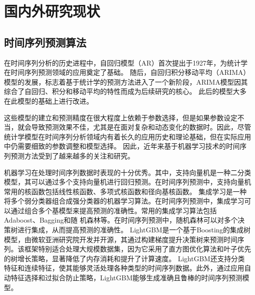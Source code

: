 \section{国内外研究现状}
\subsection{时间序列预测算法}
在时间序列分析的历史进程中，自回归模型\cite{PhysRevE.84.016106}（AR）首次提出于1927年，为统计学在时间序列预测领域的应用奠定了基础。
随后，自回归积分移动平均\cite{jiang2011multifractal}（ARIMA）模型的发展，标志着基于统计学的预测方法进入了一个新阶段，ARIMA模型因其综合了自回归、积分和移动平均的特性而成为后续研究的核心。
此后的模型大多在此模型的基础上进行改进。

这些模型的建立和预测精度在很大程度上依赖于参数选择，但是如果参数设定不当，就会导致预测效果不佳，尤其是在面对复杂和动态变化的数据时。因此，尽管统计学模型在时间序列分析领域内有着长久的应用历史和理论基础，但在实际应用中仍需要细致的参数调整和模型选择。
因此，近年来基于机器学习技术的时间序列预测方法受到了越来越多的关注和研究。

机器学习在处理时间序列数据时表现的十分优秀。其中，支持向量机\cite{zhang2020support}是一种二分类模型，其可以通过多个支持向量机进行回归预测\cite{sapankevych2009time}。在时间序列预测中，支持向量机常用的核函数包括线性核函数、多项式核函数和径向基核函数。
集成学习\cite{dong2020survey}是一种将多个弱分类器组合成强分类器的机器学习算法。在时间序列预测中，集成学习可以通过组合多个基模型来提高预测的准确性\cite{galicia2019multi}。常用的集成学习算法包括Adaboost\cite{hastie2009multi}、Bagging\cite{quinlan1996bagging}和随
机森林\cite{genuer2020random}等。在时间序列预测中，随机森林可以对多个决策树进行集成，从而提高预测的准确性\cite{khashei2019comparative}。
LightGBM\cite{ke2017lightgbm}是一个基于Boosting的集成树模型，由微软亚洲研究院开发并开源，其通过构建梯度提升决策树来预测时间序列。该框架特别适合处理大规模数据集，因为它采用了直方图优化算法和叶子优先的树增长策略，显著降低了内存消耗和提升了计算速度。
LightGBM还支持分类特征和连续特征，使其能够灵活处理各种类型的时间序列数据。此外，通过应用自动特征选择和过拟合防止策略，LightGBM能够生成准确且鲁棒的时间序列预测模型。

